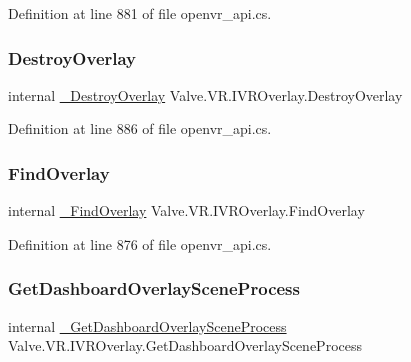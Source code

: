 Definition at line 881 of file openvr\+\_\+api.\+cs.

\mbox{\label{struct_valve_1_1_v_r_1_1_i_v_r_overlay_a587dd1b736f60c21539c5dd288cfd411}} 
\subsubsection{\texorpdfstring{DestroyOverlay}{DestroyOverlay}}
{\footnotesize\ttfamily internal \mbox{\hyperlink{struct_valve_1_1_v_r_1_1_i_v_r_overlay_a7d6cd1a264d3c052ca478ea34a3606ce}{\+\_\+\+Destroy\+Overlay}} Valve.\+V\+R.\+I\+V\+R\+Overlay.\+Destroy\+Overlay}



Definition at line 886 of file openvr\+\_\+api.\+cs.

\mbox{\label{struct_valve_1_1_v_r_1_1_i_v_r_overlay_af463715ed3ec4cb05310d02e970e69d3}} 
\subsubsection{\texorpdfstring{FindOverlay}{FindOverlay}}
{\footnotesize\ttfamily internal \mbox{\hyperlink{struct_valve_1_1_v_r_1_1_i_v_r_overlay_a3018bc78389f3d9518de18d91c61f056}{\+\_\+\+Find\+Overlay}} Valve.\+V\+R.\+I\+V\+R\+Overlay.\+Find\+Overlay}



Definition at line 876 of file openvr\+\_\+api.\+cs.

\mbox{\label{struct_valve_1_1_v_r_1_1_i_v_r_overlay_a088b895f92c6250d2e9ed920aff74d12}} 
\subsubsection{\texorpdfstring{GetDashboardOverlaySceneProcess}{GetDashboardOverlaySceneProcess}}
{\footnotesize\ttfamily internal \mbox{\hyperlink{struct_valve_1_1_v_r_1_1_i_v_r_overlay_ac3f0a30c6da88a835a1649b4eee9f314}{\+\_\+\+Get\+Dashboard\+Overlay\+Scene\+Process}} Valve.\+V\+R.\+I\+V\+R\+Overlay.\+Get\+Dashboard\+Overlay\+Scene\+Process}



